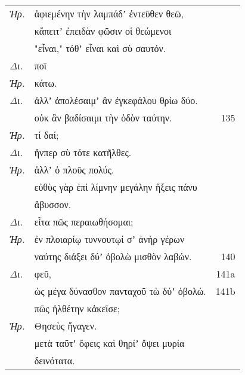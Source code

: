 \documentclass[13pt]{article}
\begin{document}
\begin{greek}
\begin{spacing}{1.5}
\begin{tabularx}{\textwidth}{@{}lXr@{}}
  \textit{Ἡρ.} & ἀφιεμένην τὴν λαμπάδʼ ἐντεῦθεν θεῶ, & \\
  & κἄπειτʼ ἐπειδὰν φῶσιν οἱ θεώμενοι & \\
  & "εἷναι," τόθʼ εἷναι καὶ σὺ σαυτόν. & \\
  \textit{Δι.} & \hspace*{14em}ποῖ & \\
  \textit{Ἡρ.} & \hspace*{16em}κάτω. & \\
  \textit{Δι.} & ἀλλʼ ἀπολέσαιμʼ ἂν ἐγκεφάλου θρίω δύο. & \\
  & οὐκ ἂν βαδίσαιμι τὴν ὁδὸν ταύτην. & 135 \\
  \textit{Ἡρ.} & \hspace*{15em}τί δαί; & \\
  \textit{Δι.} & ἥνπερ σὺ τότε κατῆλθες. & \\
  \textit{Ἡρ.} &\hspace*{11em}ἀλλʼ ὁ πλοῦς πολύς.  & \\
  & εὐθὺς γὰρ ἐπὶ λίμνην μεγάλην ἥξεις πάνυ & \\
  & ἄβυσσον. & \\
  \textit{Δι.} & \hspace*{5.5em}εἶτα πῶς περαιωθήσομαι; & \\
  \textit{Ἡρ.} & ἐν πλοιαρίῳ τυννουτῳί σʼ ἀνὴρ γέρων & \\
  & ναύτης διάξει δύʼ ὀβολὼ μισθὸν λαβών. & 140 \\
  \textit{Δι.} & φεῦ,  & 141a \\
  & ὡς μέγα δύνασθον πανταχοῦ τὼ δύʼ ὀβολώ. & 141b \\
  & πῶς ἠλθέτην κἀκεῖσε; & \\
  \textit{Ἡρ.} & \hspace*{10em}Θησεὺς ἤγαγεν.& \\
  & μετὰ ταῦτʼ ὄφεις καὶ θηρίʼ ὄψει μυρία &  \\
  & δεινότατα. & \\
  

\end{tabularx}

\end{spacing}



\newpage


\end{greek}
\end{document}

